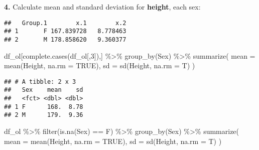 \documentclass[
]{article}
\newenvironment{Shaded}{\begin{snugshade}}{\end{snugshade}}
\newcommand{\AttributeTok}[1]{\textcolor[rgb]{0.77,0.63,0.00}{#1}}
\newcommand{\ConstantTok}[1]{\textcolor[rgb]{0.00,0.00,0.00}{#1}}
\newcommand{\ControlFlowTok}[1]{\textcolor[rgb]{0.13,0.29,0.53}{\textbf{#1}}}
\newcommand{\DecValTok}[1]{\textcolor[rgb]{0.00,0.00,0.81}{#1}}
\newcommand{\FunctionTok}[1]{\textcolor[rgb]{0.00,0.00,0.00}{#1}}
\newcommand{\NormalTok}[1]{#1}
\newcommand{\SpecialCharTok}[1]{\textcolor[rgb]{0.00,0.00,0.00}{#1}}
\begin{document}
\textbf{4. } Calculate mean and standard deviation for \textbf{height},
each sex:

\begin{Shaded}
\end{Shaded}

\begin{verbatim}
##   Group.1        x.1        x.2
## 1       F 167.839728   8.778463
## 2       M 178.858620   9.360377
\end{verbatim}

\begin{Shaded}
\begin{Highlighting}[]
\NormalTok{df\_ol[}\FunctionTok{complete.cases}\NormalTok{(df\_ol[,}\DecValTok{3}\NormalTok{]),] }\SpecialCharTok{\%\textgreater{}\%}  \FunctionTok{group\_by}\NormalTok{(Sex) }\SpecialCharTok{\%\textgreater{}\%} 
  \FunctionTok{summarize}\NormalTok{(}
    \AttributeTok{mean =} \FunctionTok{mean}\NormalTok{(Height, }\AttributeTok{na.rm =} \ConstantTok{TRUE}\NormalTok{),  }\AttributeTok{sd =} \FunctionTok{sd}\NormalTok{(Height, }\AttributeTok{na.rm =}\NormalTok{ T)}
\NormalTok{  )}
\end{Highlighting}
\end{Shaded}

\begin{verbatim}
## # A tibble: 2 x 3
##   Sex    mean    sd
##   <fct> <dbl> <dbl>
## 1 F      168.  8.78
## 2 M      179.  9.36
\end{verbatim}

\begin{Shaded}
\begin{Highlighting}[]
\NormalTok{df\_ol }\SpecialCharTok{\%\textgreater{}\%} \FunctionTok{filter}\NormalTok{(}\FunctionTok{is.na}\NormalTok{(Sex) }\SpecialCharTok{==}\NormalTok{ F) }\SpecialCharTok{\%\textgreater{}\%} \FunctionTok{group\_by}\NormalTok{(Sex) }\SpecialCharTok{\%\textgreater{}\%} 
  \FunctionTok{summarize}\NormalTok{(}
    \AttributeTok{mean =} \FunctionTok{mean}\NormalTok{(Height, }\AttributeTok{na.rm =} \ConstantTok{TRUE}\NormalTok{),  }\AttributeTok{sd =} \FunctionTok{sd}\NormalTok{(Height, }\AttributeTok{na.rm =}\NormalTok{ T)}
\NormalTok{  )}
\end{Highlighting}
\end{Shaded}
\end{document}
